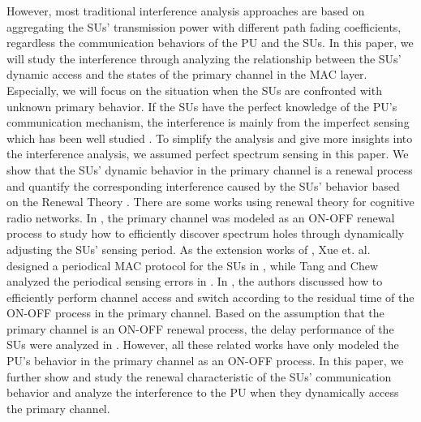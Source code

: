 \documentclass[11pt,draftcls]{IEEEtran}{\onecolumn}
\begin{document}
However, most traditional interference analysis approaches are based
on aggregating the SUs' transmission power with different path
fading coefficients, regardless the communication behaviors of the
PU and the SUs. In this paper, we will study the interference
through analyzing the relationship between the SUs' dynamic access
and the states of the primary channel in the MAC layer. Especially,
we will focus on the situation when the SUs are confronted with
unknown primary behavior. If the SUs have the perfect knowledge of
the PU's communication mechanism, the interference is mainly from
the imperfect sensing which has been well studied \cite{11}. To
simplify the analysis and give more insights into the interference
analysis, we assumed perfect spectrum sensing in this paper. We show
that the SUs' dynamic behavior in the primary channel is a renewal
process and quantify the corresponding interference caused by the
SUs' behavior based on the Renewal Theory \cite{renew}. There are
some works using renewal theory for cognitive radio networks. In
\cite{12}, the primary channel was modeled as an ON-OFF renewal
process to study how to efficiently discover spectrum holes through
dynamically adjusting the SUs' sensing period. As the extension
works of \cite{12}, Xue et. al. designed a periodical MAC protocol
for the SUs in \cite{25}, while Tang and Chew analyzed the
periodical sensing errors in \cite{27}. In \cite{26}\cite{29}, the
authors discussed how to efficiently perform channel access and
switch according to the residual time of the ON-OFF process in the
primary channel. Based on the assumption that the primary channel is
an ON-OFF renewal process, the delay performance of the SUs were
analyzed in \cite{30}\cite{31}. However, all these related works
have only modeled the PU's behavior in the primary channel as an
ON-OFF process. In this paper, we further show and study the renewal
characteristic of the SUs' communication behavior and analyze the
interference to the PU when they dynamically access the primary
channel.
\end{document}
